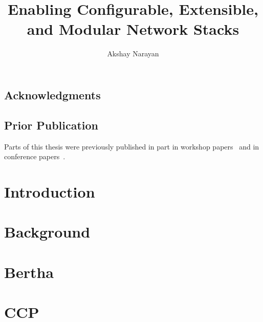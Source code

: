 \documentclass[fontsize=12pt,paper=letter,twosided,cleardoublepage=plain,final]{scrbook}
\title{Enabling Configurable, Extensible, and Modular Network Stacks}
\author{Akshay Narayan}
\begin{document}
\frontmatter



\cleardoublepage


\cleardoublepage

\section*{Acknowledgments}
\begin{spacing}{1}

\end{spacing}
\cleardoublepage

\section*{Prior Publication}
Parts of this thesis were previously published in part in workshop papers~\cite{ccp, bertha} and in conference
papers~\cite{ccp, bundler, park}.
\cleardoublepage

\tableofcontents

\mainmatter

\chapter{Introduction}\label{s:intro}



\chapter{Background}\label{s:background}


\chapter{Bertha}\label{s:bertha}








\chapter{CCP}\label{s:ccp}
\end{document}
